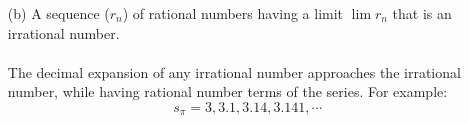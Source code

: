 \begin{itemize}
\begin{itemize}
      \item [(b)] A sequence ($r_n$) of rational numbers having a limit $\lim r_n$ that is an irrational number.\\\\
        The decimal expansion of any irrational number approaches the irrational number, while having rational number terms of the series. For example:
        $$s_{\pi} = 3, 3.1, 3.14, 3.141, \cdots$$
    \end{itemize}
\end{itemize}


